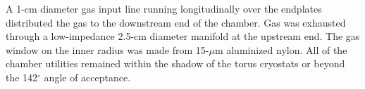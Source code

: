 A 1-cm diameter gas input line running longitudinally over the endplates 
distributed the gas to the downstream end of the chamber. Gas was exhausted 
through a low-impedance 2.5-cm diameter manifold at the upstream end.  The gas 
window on the inner radius was made from 15-$\mu$m aluminized nylon.  All of 
the chamber utilities remained within the shadow of the torus cryostats or beyond 
the 142$^{\circ}$ angle of acceptance.
